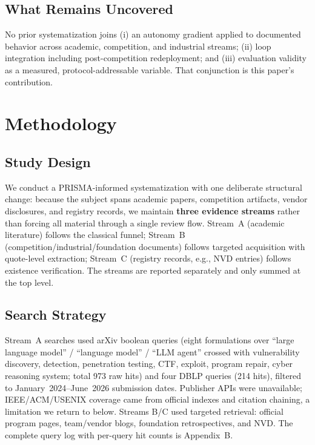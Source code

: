 \documentclass[conference,compsoc]{IEEEtran}
\begin{document}
\subsection{What Remains Uncovered}
No prior systematization joins (i) an autonomy gradient applied to documented behavior across
academic, competition, and industrial streams; (ii) loop integration including post-competition
redeployment; and (iii) evaluation validity as a measured, protocol-addressable variable. That
conjunction is this paper's contribution.

\section{Methodology}
\label{sec:method}

\subsection{Study Design}
We conduct a PRISMA-informed systematization with one deliberate structural change: because the
subject spans academic papers, competition artifacts, vendor disclosures, and registry records,
we maintain \textbf{three evidence streams} rather than forcing all material through a single
review flow. Stream~A (academic literature) follows the classical funnel; Stream~B
(competition/industrial/foundation documents) follows targeted acquisition with quote-level
extraction; Stream~C (registry records, e.g., NVD entries) follows existence verification. The
streams are reported separately and only summed at the top level.

\subsection{Search Strategy}
Stream~A searches used arXiv boolean queries (eight formulations over ``large language model''
/ ``language model'' / ``LLM agent'' crossed with vulnerability discovery, detection,
penetration testing, CTF, exploit, program repair, cyber reasoning system; total 973 raw hits)
and four DBLP queries (214 hits), filtered to January~2024--June~2026 submission dates.
Publisher APIs were unavailable; IEEE/ACM/USENIX coverage came from official indexes and
citation chaining, a limitation we return to below. Streams B/C used targeted retrieval:
official program pages, team/vendor blogs, foundation retrospectives, and NVD. The complete
query log with per-query hit counts is Appendix~B.
\end{document}
